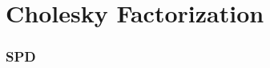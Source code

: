 \documentclass[11pt,a4paper]{article}
\begin{document}
\begin{titlepage}
    \maketitle
\end{titlepage}
\begin{center} 
    \tableofcontents  
\end{center}
\newpage
\part{Cholesky Factorization}
\section{SPD}
\renewcommand{\AA}{\left( \begin{array}{cc}
            A_{00} & a_{10}  \\
            a_{10}^T & \alpha_{11} 
        \end{array} \right) }
\newcommand{\AAT}{\left( \begin{array}{cc}
            A_{00}^T & a_{10}  \\
            a_{10}^T & \alpha_{11}
        \end{array} \right) }
\newcommand{\xx}{\left( \begin{array}{c}
            x_{0}  \\ \chi_{1} 
        \end{array} \right)}
\end{document}
